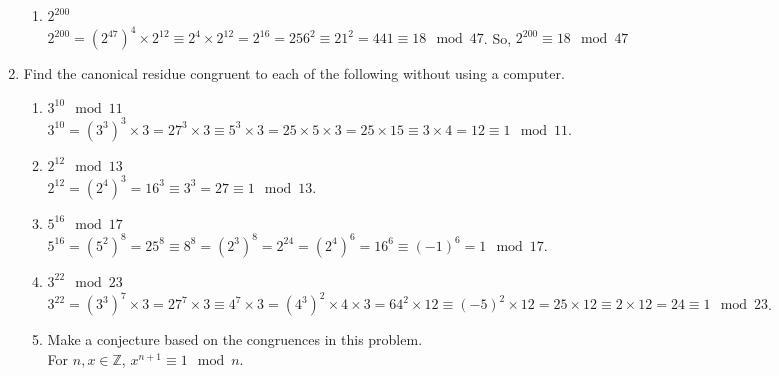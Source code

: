 \documentclass{article}
\begin{document}
\begin{enumerate}
\begin{enumerate}
                  \item $2^{200}$\\
                        $2^{200} = (2^{47})^{4} \times 2^{12} \equiv 2^{4} \times 2^{12} = 2^{16} = 256^{2} \equiv 21^{2} = 441 \equiv 18 \mod{47}$. So, $2^{200} \equiv 18 \mod {47}$
            \end{enumerate}
      \item Find the canonical residue congruent to each of the following without using a computer.
            \begin{enumerate}
                  \item $3^{10} \mod{11}$\\
                        $3^{10} = (3^{3})^{3} \times 3 = 27^{3} \times 3 \equiv 5^{3} \times 3 = 25 \times 5 \times 3 = 25 \times 15 \equiv 3 \times 4 = 12 \equiv 1 \mod{11}$.
                  \item $2^{12} \mod{13}$\\
                        $2^{12} = (2^{4})^{3} = 16^{3} \equiv 3^{3} = 27 \equiv 1 \mod{13}$.
                  \item $5^{16} \mod{17}$\\
                        $5^{16} = (5^{2})^{8} = 25^{8} \equiv 8^{8} = (2^{3})^{8} = 2^{24} = (2^{4})^{6} = 16^{6} \equiv (-1)^{6} = 1 \mod{17}$.
                  \item $3^{22} \mod{23}$\\
                  $3^{22} = (3^{3})^{7} \times 3 = 27^{7} \times 3 \equiv 4^{7} \times 3 = (4^{3})^{2} \times 4 \times 3 = 64^{2} \times 12 \equiv (-5)^{2} \times 12 = 25 \times 12 \equiv 2 \times 12 = 24 \equiv 1 \mod{23}$.
                  \item Make a conjecture based on the congruences in this problem.\\
                  For $n, x \in \mathbb{Z}$, $x^{n+1} \equiv 1 \mod{n}$.
            \end{enumerate}
\end{enumerate}
\end{document}
